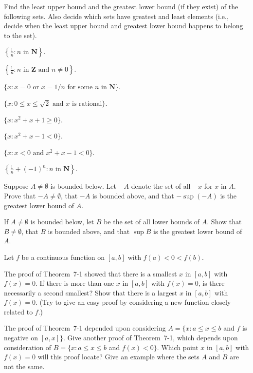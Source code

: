  Find the least upper bound and the greatest lower bound (if they
exist) of the following sets. Also decide which sets have greatest and least
elements (i.e., decide when the least upper bound and greatest lower bound
happens to belong to the set).
\begin{romans}
\item $\displaystyle\left\{\frac{1}{n} : n\text{ in }\mathbf{N}\right\}$.
\item $\displaystyle\left\{\frac{1}{n} : n\text{ in }\mathbf{Z}\text{ and }n \neq 0\right\}$.
\item $\{x : x = 0\text{ or }x = 1/n\text{ for some $n$ in }\mathbf{N}\}$.
\item $\{x : 0 \leq x \leq \sqrt{2}\text{ and $x$ is rational}\}$.
\item $\{x : x^2 + x + 1 \geq 0\}$.
\item $\{x : x^2 + x - 1 < 0\}$.
\item $\{x : x < 0\text{ and }x^2 + x - 1 < 0\}$.
\item $\displaystyle\left\{\frac{1}{n} + (-1)^n : n\text{ in }\mathbf{N}\right\}$.
\end{romans}

\begin{letters}
\item Suppose $A \neq \emptyset$ is bounded below. Let $-A$ denote the set of
  all $-x$ for $x$ in $A$. Prove that $-A \neq \emptyset$, that $-A$ is
  bounded above, and that $-\sup(-A)$ is the greatest lower bound of $A$.
\item If $A \neq \emptyset$ is bounded below, let $B$ be the set of all lower
  bounds of $A$. Show that $B \neq \emptyset$, that $B$ is bounded above, and
  that $\sup B$ is the greatest lower bound of $A$.
\end{letters}

 Let $f$ be a continuous function on $[a,b]$ with
$f(a) < 0 < f(b)$.
\begin{letters}
\item The proof of Theorem~7-1 showed that there is a smallest $x$ in
  $[a,b]$ with $f(x) = 0$. If there is more than one $x$ in $[a,b]$ with
  $f(x) = 0$, is there necessarily a second smallest? Show that there is a
  largest $x$ in $[a,b]$ with $f(x) = 0$. (Try to give an easy proof by
  considering a new function closely related to $f$.)
\item The proof of Theorem~7-1 depended upon considering
  $A = \{x : a \leq x \leq b$ and $f$ is negative on $[a,x]\}$. Give
  another proof of Theorem~7-1, which depends upon consideration of
  $B = \{x : a \leq x \leq b$ and $f(x) < 0\}$. Which point $x$ in
  $[a,b]$ with $f(x) = 0$ will this proof locate? Give an example where the
  sets $A$ and $B$ are not the same.
\end{letters}

